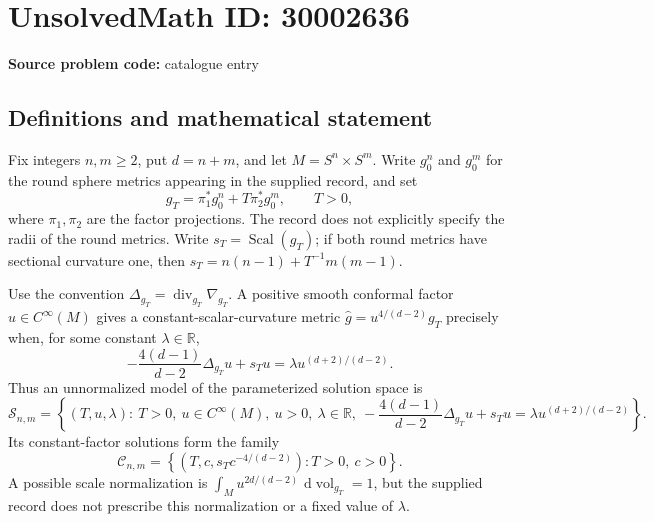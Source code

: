 \documentclass[11pt]{article}
\newcommand{\R}{\mathbb{R}}
\newcommand{\dd}{\,\mathrm{d}}
\begin{document}
\section*{UnsolvedMath ID: 30002636}
\textbf{Source problem code:} catalogue entry
\subsection{Definitions and mathematical statement}
Fix integers \(n,m\geq 2\), put \(d=n+m\), and let \(M=S^n\times S^m\). Write \(g_0^n\) and \(g_0^m\) for the round sphere metrics appearing in the supplied record, and set
\[
 g_T=\pi_1^*g_0^n+T\pi_2^*g_0^m,\qquad T>0,
\]
where \(\pi_1,\pi_2\) are the factor projections. The record does not explicitly specify the radii of the round metrics. Write \(s_T=\operatorname{Scal}(g_T)\); if both round metrics have sectional curvature one, then \(s_T=n(n-1)+T^{-1}m(m-1)\).

Use the convention \(\Delta_{g_T}=\operatorname{div}_{g_T}\nabla_{g_T}\). A positive smooth conformal factor \(u\in C^\infty(M)\) gives a constant-scalar-curvature metric \(\widehat g=u^{4/(d-2)}g_T\) precisely when, for some constant \(\lambda\in\R\),
\[
 -\frac{4(d-1)}{d-2}\Delta_{g_T}u+s_Tu
 =\lambda u^{(d+2)/(d-2)}.
\]
Thus an unnormalized model of the parameterized solution space is
\[
 \mathcal S_{n,m}=\left\{(T,u,\lambda):\ T>0,\ u\in C^\infty(M),\ u>0,\ \lambda\in\R,\ -\frac{4(d-1)}{d-2}\Delta_{g_T}u+s_Tu=\lambda u^{(d+2)/(d-2)}\right\}.
\]
Its constant-factor solutions form the family
\[
 \mathcal C_{n,m}=\left\{(T,c,s_Tc^{-4/(d-2)}):T>0,\ c>0\right\}.
\]
A possible scale normalization is \(\int_M u^{2d/(d-2)}\,\dd\operatorname{vol}_{g_T}=1\), but the supplied record does not prescribe this normalization or a fixed value of \(\lambda\).
\end{document}
